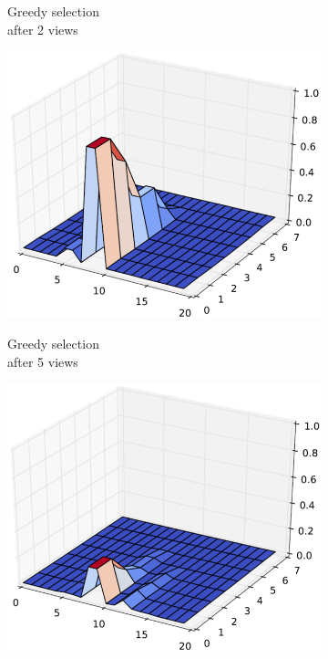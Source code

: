 \documentclass[letterpaper, 10 pt, conference]{ieeeconf}  %
\begin{document}
\begin{figure}
\begin{subfigure}[b]{.24\textwidth}
        \caption{Greedy selection \\ after 2 views}
        \vspace*{2mm}
        \label{fig:greedy2view}
    \end{subfigure}
    \hfill
    \begin{subfigure}[b]{.24\textwidth}
        \centering
        {\includegraphics[width=.99\textwidth]{greedy3.png}}
        \caption{Greedy selection \\ after 5 views}
        \vspace*{2mm}
        \label{fig:greedy5view}
    \end{subfigure}
    \hfill
    \begin{subfigure}[b]{.24\textwidth}
        \centering
        {\includegraphics[width=.99\textwidth]{greedy4.png}}

\end{subfigure}
\end{figure}
\end{document}
